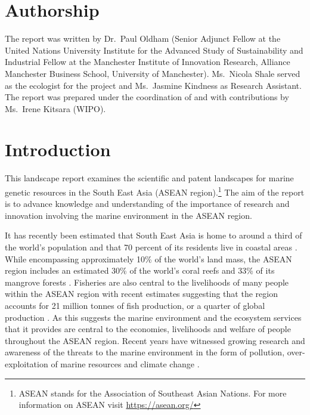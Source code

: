 \documentclass[]{book}
\let\rmarkdownfootnote\footnote%
\def\footnote{\protect\rmarkdownfootnote}
\theoremstyle{definition}
\theoremstyle{definition}
\theoremstyle{definition}
\theoremstyle{remark}
\begin{document}
\hypertarget{authorship}{%
\chapter*{Authorship}\label{authorship}}

The report was written by Dr.~Paul Oldham (Senior Adjunct Fellow at the
United Nations University Institute for the Advanced Study of
Sustainability and Industrial Fellow at the Manchester Institute of
Innovation Research, Alliance Manchester Business School, University of
Manchester). Ms.~Nicola Shale served as the ecologist for the project
and Ms.~Jasmine Kindness as Research Assistant. The report was prepared
under the coordination of and with contributions by Ms.~Irene Kitsara
(WIPO).

\hypertarget{intro}{%
\chapter{Introduction}\label{intro}}

This landscape report examines the scientific and patent landscapes for
marine genetic resources in the South East Asia (ASEAN
region).\footnote{ASEAN stands for the Association of Southeast Asian
  Nations. For more information on ASEAN visit \url{https://asean.org/}}
The aim of the report is to advance knowledge and understanding of the
importance of research and innovation involving the marine environment
in the ASEAN region.

It has recently been estimated that South East Asia is home to around a
third of the world's population and that 70 percent of its residents
live in coastal areas \citep[Olewiler in][]{Marine_2016}. While
encompassing approximately 10\% of the world's land mass, the ASEAN
region includes an estimated 30\% of the world's coral reefs and 33\% of
its mangrove forests \citep{Marine_2016}. Fisheries are also central to
the livelihoods of many people within the ASEAN region with recent
estimates suggesting that the region accounts for 21 million tonnes of
fish production, or a quarter of global production \citep[Ferrer
in][]{Marine_2016}. As this suggests the marine environment and the
ecosystem services that it provides are central to the economies,
livelihoods and welfare of people throughout the ASEAN region. Recent
years have witnessed growing research and awareness of the threats to
the marine environment in the form of pollution, over-exploitation of
marine resources and climate change \citep{Marine_2016}.
\end{document}
